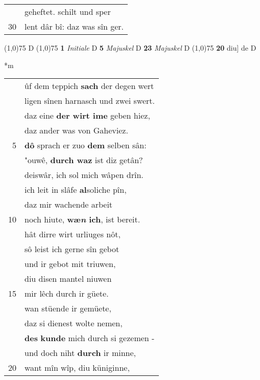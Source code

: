 \documentclass[8pt,a4paper,notitlepage]{article}
\begin{document}
\begin{table}[ht]
\begin{minipage}[t]{0.5\linewidth}
\begin{tabular}{rl}
 & geheftet. schilt und sper\\ 
30 & lent dâr bî: daz was sîn ger.\\ 
\end{tabular}
\scriptsize
\line(1,0){75} \newline
D \newline
\line(1,0){75} \newline
\textbf{1} \textit{Initiale} D  \textbf{5} \textit{Majuskel} D  \textbf{23} \textit{Majuskel} D  \newline
\line(1,0){75} \newline
\textbf{20} diu] de D \newline
\end{minipage}
\hspace{0.5cm}
\begin{minipage}[t]{0.5\linewidth}
\small
\begin{center}*m
\end{center}
\begin{tabular}{rl}
 & ûf dem teppich \textbf{sach} der degen wert\\ 
 & ligen sînen harnasch und zwei swert.\\ 
 & daz eine \textbf{der wirt ime} geben hiez,\\ 
 & daz ander was von Gaheviez.\\ 
5 & \textbf{dô} sprach er zuo \textbf{dem} selben sân:\\ 
 & "ouwê, \textbf{durch waz} ist diz getân?\\ 
 & deiswâr, ich sol mich wâpen drîn.\\ 
 & ich leit in slâfe \textbf{al}soliche pîn,\\ 
 & daz mir wachende arbeit\\ 
10 & noch hiute, \textbf{wæ\textit{n} ich}, ist bereit.\\ 
 & hât dirre wirt urliuges nôt,\\ 
 & sô leist ich gerne sîn gebot\\ 
 & und ir gebot mit triuwen,\\ 
 & diu disen mantel niuwen\\ 
15 & mir lêch durch ir güete.\\ 
 & wan stüende ir gemüete,\\ 
 & daz si dienest wolte nemen,\\ 
 & \textbf{des} \textbf{kunde} mich durch si gezemen -\\ 
 & und doch niht \textbf{durch} ir minne,\\ 
20 & want mîn wîp, diu küniginne,\\ 

\end{tabular}
\end{minipage}
\end{table}
\end{document}
